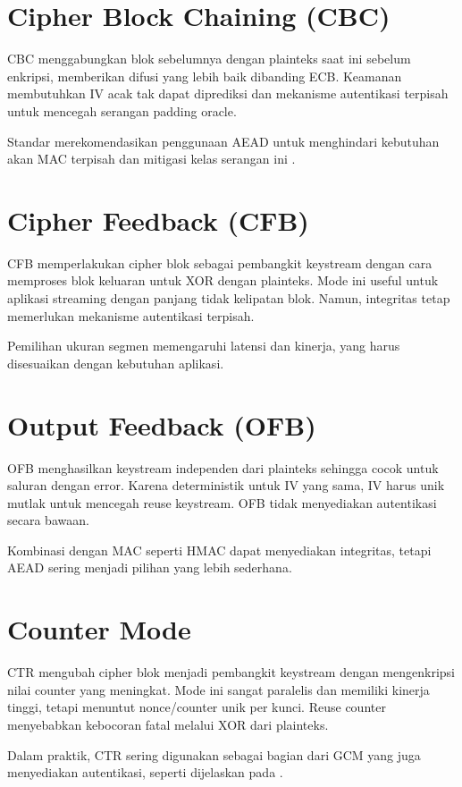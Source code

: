 \documentclass[../main.tex]{subfiles}
\begin{document}
\section{Cipher Block Chaining (CBC)}
CBC menggabungkan blok sebelumnya dengan plainteks saat ini sebelum enkripsi, memberikan difusi yang lebih baik dibanding ECB. Keamanan membutuhkan IV acak tak dapat diprediksi dan mekanisme autentikasi terpisah untuk mencegah serangan padding oracle.

Standar merekomendasikan penggunaan AEAD untuk menghindari kebutuhan akan MAC terpisah dan mitigasi kelas serangan ini \parencite{nist80038d}.

\section{Cipher Feedback (CFB)}
CFB memperlakukan cipher blok sebagai pembangkit keystream dengan cara memproses blok keluaran untuk XOR dengan plainteks. Mode ini useful untuk aplikasi streaming dengan panjang tidak kelipatan blok. Namun, integritas tetap memerlukan mekanisme autentikasi terpisah.

Pemilihan ukuran segmen memengaruhi latensi dan kinerja, yang harus disesuaikan dengan kebutuhan aplikasi.

\section{Output Feedback (OFB)}
OFB menghasilkan keystream independen dari plainteks sehingga cocok untuk saluran dengan error. Karena deterministik untuk IV yang sama, IV harus unik mutlak untuk mencegah reuse keystream. OFB tidak menyediakan autentikasi secara bawaan.

Kombinasi dengan MAC seperti HMAC dapat menyediakan integritas, tetapi AEAD sering menjadi pilihan yang lebih sederhana.

\section{Counter Mode}
CTR mengubah cipher blok menjadi pembangkit keystream dengan mengenkripsi nilai counter yang meningkat. Mode ini sangat paralelis dan memiliki kinerja tinggi, tetapi menuntut nonce/counter unik per kunci. Reuse counter menyebabkan kebocoran fatal melalui XOR dari plainteks.

Dalam praktik, CTR sering digunakan sebagai bagian dari GCM yang juga menyediakan autentikasi, seperti dijelaskan pada \textcite{nist80038d}.
\end{document}
